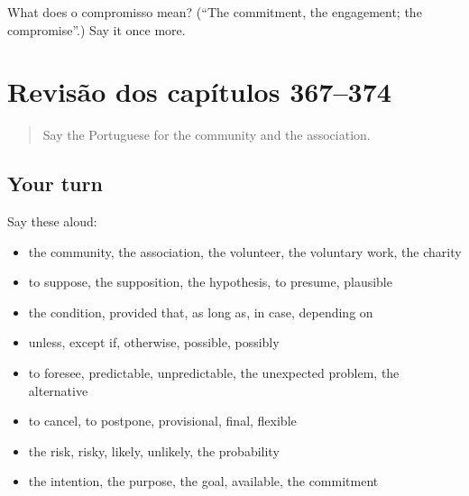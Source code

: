 \begin{tcolorbox}[breakable,colback=teal!4,colframe=teal!35!black,title={Before you move on}]
What does o compromisso mean? (\textquotedblleft{}The commitment, the engagement; the compromise\textquotedblright{}.) Say it once more.
\end{tcolorbox}
\section[(dialogue)]{Revisão dos capítulos 367–374}

\label{lesson:PT-R374-revisao-367-374}



\begin{quote}
Say the Portuguese for the community and the association.
\end{quote}

\subsection*{Your turn}
Say these aloud:

\begin{itemize}
\raggedright
  \item the community, the association, the volunteer, the voluntary work, the charity
  \item to suppose, the supposition, the hypothesis, to presume, plausible
  \item the condition, provided that, as long as, in case, depending on
  \item unless, except if, otherwise, possible, possibly
  \item to foresee, predictable, unpredictable, the unexpected problem, the alternative
  \item to cancel, to postpone, provisional, final, flexible
  \item the risk, risky, likely, unlikely, the probability
  \item the intention, the purpose, the goal, available, the commitment
\end{itemize}


